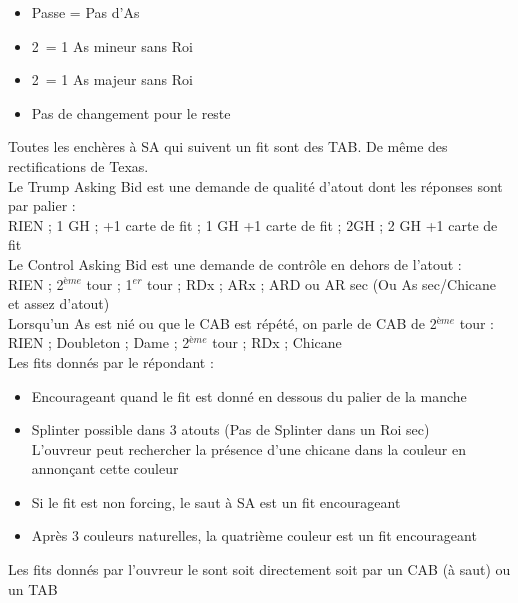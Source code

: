 \documentclass[a4paper, oneside, 11pt]{report}
\begin{document}
		\begin{itemize}
		\item Passe = Pas d'As
		\item 2\carreau\ = 1 As mineur sans Roi
		\item 2\coeur\ = 1 As majeur sans Roi
		\item Pas de changement pour le reste\\
		\end{itemize}
	
		Toutes les enchères à SA qui suivent un fit sont des TAB. De même des rectifications de Texas.\\
			
		Le Trump Asking Bid est une demande de qualité d'atout dont les réponses sont par palier :\\
		RIEN ; 1 GH ; +1 carte de fit ; 1 GH +1 carte de fit ; 2GH ; 2 GH +1 carte de fit\\
	
		Le Control Asking Bid est une demande de contrôle en dehors de l'atout :\\
		RIEN ; 2$^{ème}$ tour ; 1$^{er}$ tour ; RDx ; ARx ; ARD ou AR sec (Ou As sec/Chicane et assez d'atout)\\
	
		Lorsqu'un As est nié ou que le CAB est répété, on parle de CAB de 2$^{ème}$ tour :\\
		RIEN ; Doubleton ; Dame ; 2$^{ème}$ tour ; RDx ; Chicane\\
		
		Les fits donnés par le répondant :
		\begin{itemize}
		\item Encourageant quand le fit est donné en dessous du palier de la manche
		\item Splinter possible dans 3 atouts (Pas de Splinter dans un Roi sec)\\
		L'ouvreur peut rechercher la présence d'une chicane dans la couleur en annonçant cette couleur
		\item Si le fit est non forcing, le saut à SA est un fit encourageant
		\item Après 3 couleurs naturelles, la quatrième couleur est un fit encourageant
		\end{itemize}
		Les fits donnés par l'ouvreur le sont soit directement soit par un CAB (à saut) ou un TAB\\
\end{document}
